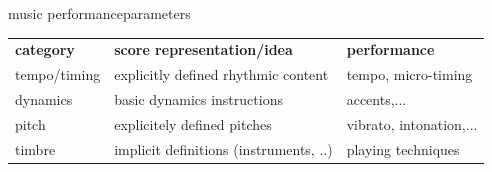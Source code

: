         \begin{frame}{music performance}{parameters}
            \begin{table}
            \begin{tabular}{lll}
                \textbf{category}   & \textbf{score representation/idea} & \textbf{performance} \\
                tempo/timing        & explicitly defined rhythmic content&  tempo, micro-timing\\
                dynamics            &basic dynamics instructions            & accents,...\\
                pitch               & explicitely defined pitches           & vibrato, intonation,...\\
                timbre              & implicit definitions (instruments, ..) & playing techniques
            \end{tabular}
            \end{table}
            
        \end{frame}
   
